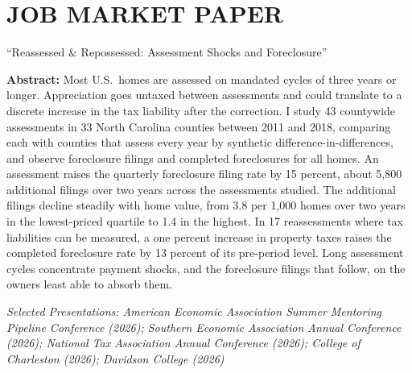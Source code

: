 \documentclass[11pt,letterpaper]{article}
\begin{document}
\section*{JOB MARKET PAPER}
``Reassessed \& Repossessed: Assessment Shocks and Foreclosure''
\begin{list}{}{\setlength{\leftmargin}{0.5in}\setlength{\rightmargin}{0.5in}\setlength{\topsep}{4pt}}
\item[] \textbf{Abstract:} Most U.S.\ homes are assessed on mandated cycles of three years or longer. Appreciation goes untaxed between assessments and could translate to a discrete increase in the tax liability after the correction. I study 43 countywide assessments in 33 North Carolina counties between 2011 and 2018, comparing each with counties that assess every year by synthetic difference-in-differences, and observe foreclosure filings and completed foreclosures for all homes. An assessment raises the quarterly foreclosure filing rate by 15 percent, about 5,800 additional filings over two years across the assessments studied. The additional filings decline steadily with home value, from 3.8 per 1,000 homes over two years in the lowest-priced quartile to 1.4 in the highest. In 17 reassessments where tax liabilities can be measured, a one percent increase in property taxes raises the completed foreclosure rate by 13 percent of its pre-period level. Long assessment cycles concentrate payment shocks, and the foreclosure filings that follow, on the owners least able to absorb them.
\end{list}
\begin{list}{}{\setlength{\leftmargin}{0.1in}\setlength{\rightmargin}{0.5in}\setlength{\topsep}{4pt}}
\item {\itshape Selected Presentations: American Economic Association Summer Mentoring Pipeline Conference (2026); Southern Economic Association Annual Conference (2026); National Tax Association Annual Conference (2026); College of Charleston (2026); Davidson College (2026)}
\end{list}

\end{document}
